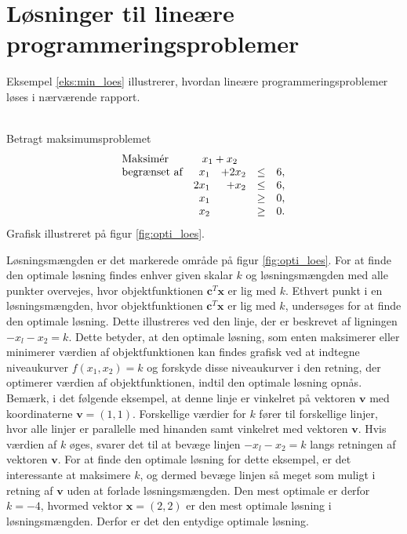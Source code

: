 \section{Løsninger til lineære programmeringsproblemer}
%
\label{heeeeejjulle}
Eksempel \ref{eks:min_loes} illustrerer, hvordan lineære programmeringsproblemer løses i nærværende rapport.
\\\\
\begin{eks}\label{eks:min_loes}
Betragt maksimumsproblemet
%
\begin{align*}
\begin{array}{lrrlr}
\text{Maksimér}		&	\multicolumn{2}{c}{x_1+x_2}  &\\
\text{begrænset af}	&x_1& + 2x_2			&\leq 	& 6,\\
					&2x_1& + x_2			&\leq	& 6,\\
					&x_1&    				&\geq	& 0,\\
					&x_2&    				&\geq	& 0.\\
\end{array}
\end{align*}
%
Grafisk illustreret på figur \ref{fig:opti_loes}.
%

%
\noindent
Løsningsmængden er det markerede område på figur \ref{fig:opti_loes}. 
For at finde den optimale løsning findes enhver given skalar $k$ og løsningsmængden med alle punkter overvejes, hvor objektfunktionen $\textbf{c}^T\textbf{x}$ er lig med $k$. 
Ethvert punkt i en løsningsmængden, hvor objektfunktionen $\textbf{c}^T\textbf{x}$ er lig med $k$, undersøges for at finde den optimale løsning.
Dette illustreres ved den linje, der er beskrevet af ligningen $-x_l-x_2=k$. 
Dette betyder, at den optimale løsning, som enten maksimerer eller minimerer værdien af objektfunktionen kan findes grafisk ved at indtegne niveaukurver $f(x_1, x_2)=k$ og forskyde disse niveaukurver i den retning, der optimerer værdien af objektfunktionen, indtil den optimale løsning opnås.  
Bemærk, i det følgende eksempel, at denne linje er vinkelret på vektoren $\textbf{v}$ med koordinaterne $\textbf{v}=(1,1)$.
Forskellige værdier for $k$ fører til forskellige linjer, hvor  alle linjer er parallelle med hinanden samt vinkelret med vektoren $\textbf{v}$. Hvis værdien af $k$ øges, svarer det til at bevæge linjen $-x_l-x_2=k$ langs retningen af vektoren $\textbf{v}$. For at finde den optimale løsning for dette eksempel, er det interessante at maksimere $k$, og dermed bevæge linjen så meget som muligt i retning af $\textbf{v}$ uden at forlade løsningsmængden. Den mest optimale er derfor $k = -4$, hvormed vektor $\textbf{x}=(2,2)$ er den mest optimale løsning i løsningsmængden. Derfor er det den entydige optimale løsning. 

\end{eks}
